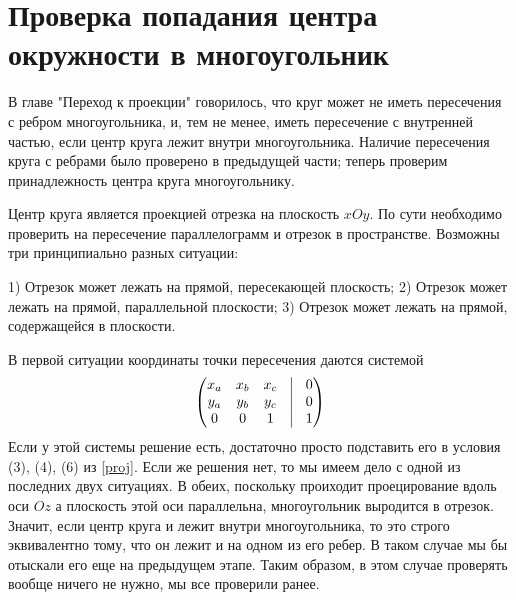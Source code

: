 \documentclass[pdftex,ptm,12pt,a4paper]{report}
\begin{document}
\section{Проверка попадания центра окружности в многоугольник}
  В главе "Переход к проекции"  говорилось, что круг может не иметь пересечения с ребром многоугольника,
  и, тем не менее, иметь пересечение с внутренней частью, если центр круга лежит внутри многоугольника.
  Наличие пересечения круга с ребрами было проверено в предыдущей части;
  теперь проверим принадлежность центра круга многоугольнику.

  Центр круга является проекцией отрезка на плоскость $xOy$.
  По сути необходимо проверить на пересечение параллелограмм и отрезок в пространстве.
  Возможны три принципиально разных ситуации:

  1) Отрезок может лежать на прямой, пересекающей плоскость;
  2) Отрезок может лежать на прямой, параллельной плоскости;
  3) Отрезок может лежать на прямой, содержащейся в плоскости.

  В первой ситуации координаты точки пересечения даются системой
  \[
    \begin{pmatrix}
     x_a & x_b & x_c & \vrule & 0\\
     y_a & y_b & y_c & \vrule & 0 \\
     0   & 0   & 1   & \vrule & 1
     \end{pmatrix}
  \]
  Если у этой системы решение есть, достаточно просто подставить его в условия (3), (4), (6) из \ref{proj}.
  Если же решения нет, то мы имеем дело с одной из последних двух ситуациях.
  В обеих, поскольку проиходит проецирование вдоль оси $Oz$ а плоскость этой оси параллельна, многоугольник выродится в отрезок.
  Значит, если центр круга и лежит внутри многоугольника, то это строго эквивалентно тому, что он лежит и на одном из его ребер.
  В таком случае мы бы отыскали его еще на предыдущем этапе.
  Таким образом, в этом случае проверять вообще ничего не нужно, мы все проверили ранее.
\end{document}
